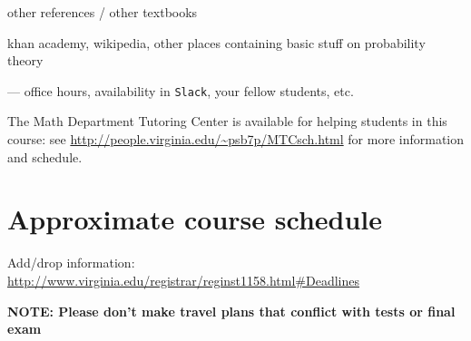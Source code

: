 \documentclass[oneside,11pt]{amsart}
\begin{document}
other references / other textbooks

khan academy, wikipedia, other places containing basic stuff on probability theory

--- office hours, availability in \texttt{Slack}, 
your fellow students, etc.

The Math Department Tutoring Center is available for helping students in this course: 
see \url{http://people.virginia.edu/~psb7p/MTCsch.html}
for more information and schedule. 

\section{Approximate course schedule}

\noindent Add/drop information: \url{http://www.virginia.edu/registrar/reginst1158.html#Deadlines}
\smallskip

\noindent \textbf{NOTE: Please don't make travel plans that conflict with tests or final exam}
\smallskip
\end{document}
